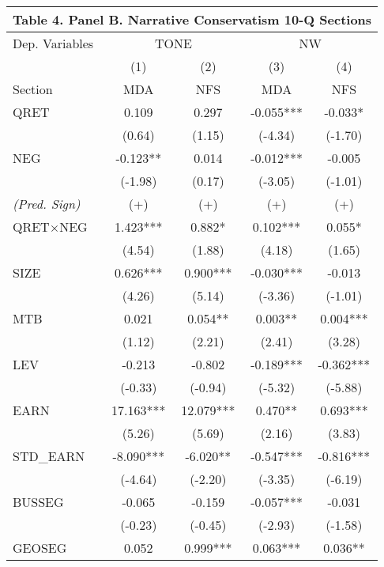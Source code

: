 \begin{table}[H] \label{T4PB}%
	\begin{center}
		\begin{tabular}{lcccc}
			\multicolumn{5}{c}{\textbf{Table 4. Panel B. Narrative Conservatism 10-Q Sections}} \\
			\midrule
			\midrule
			Dep. Variables & \multicolumn{2}{c}{TONE} & \multicolumn{2}{c}{NW} \\
			\cmidrule{2-5}
			& (1) & (2) & (3) & (4) \\
			Section & MDA & NFS & MDA & NFS \\
			\midrule
			QRET & 0.109 & 0.297 & -0.055*** & -0.033* \\
			& (0.64) & (1.15) & (-4.34) & (-1.70) \\
			NEG & -0.123** & 0.014 & -0.012*** & -0.005 \\
			& (-1.98) & (0.17) & (-3.05) & (-1.01) \\
			\rowcolor[rgb]{ .906,  .902,  .902} \textit{(Pred. Sign)} & (+) & (+) & (+) & (+) \\
			\rowcolor[rgb]{ .906,  .902,  .902} QRET$\times$NEG & 1.423*** & 0.882* & 0.102*** & 0.055* \\
			\rowcolor[rgb]{ .906,  .902,  .902} & (4.54) & (1.88) & (4.18) & (1.65) \\
			SIZE & 0.626*** & 0.900*** & -0.030*** & -0.013 \\
			& (4.26) & (5.14) & (-3.36) & (-1.01) \\
			MTB & 0.021 & 0.054** & 0.003** & 0.004*** \\
			& (1.12) & (2.21) & (2.41) & (3.28) \\
			LEV & -0.213 & -0.802 & -0.189*** & -0.362*** \\
			& (-0.33) & (-0.94) & (-5.32) & (-5.88) \\
			EARN & 17.163*** & 12.079*** & 0.470** & 0.693*** \\
			& (5.26) & (5.69) & (2.16) & (3.83) \\
			STD\_EARN & -8.090*** & -6.020** & -0.547*** & -0.816*** \\
			& (-4.64) & (-2.20) & (-3.35) & (-6.19) \\
			BUSSEG & -0.065 & -0.159 & -0.057*** & -0.031 \\
			& (-0.23) & (-0.45) & (-2.93) & (-1.58) \\
			GEOSEG & 0.052 & 0.999*** & 0.063*** & 0.036** \\

\end{tabular}
\end{center}
\end{table}

